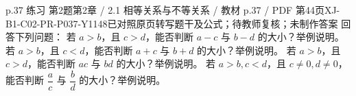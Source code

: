 \par\noindent\begin{minipage}{\linewidth}
\begin{bankitem}{p.37 练习 第2题}{第2章 / 2.1 相等关系与不等关系 / 教材 p.37 / PDF 第44页}{XJ-B1-C02-PR-P037-Y1148}{已对照原页转写题干及公式；待教师复核；未制作答案}
回答下列问题：
若 $a>b$，且 $c>d$，能否判断 $a-c$ 与 $b-d$ 的大小？举例说明。
若 $a>b$，且 $c<d$，能否判断 $a+c$ 与 $b+d$ 的大小？举例说明。
若 $a>b$，且 $c>d$，能否判断 $ac$ 与 $bd$ 的大小？举例说明。
若 $a>b,c<d$，且 $c\ne0,d\ne0$，能否判断 $\dfrac ac$ 与 $\dfrac bd$ 的大小？举例说明。
\end{bankitem}
\end{minipage}\par\medskip
